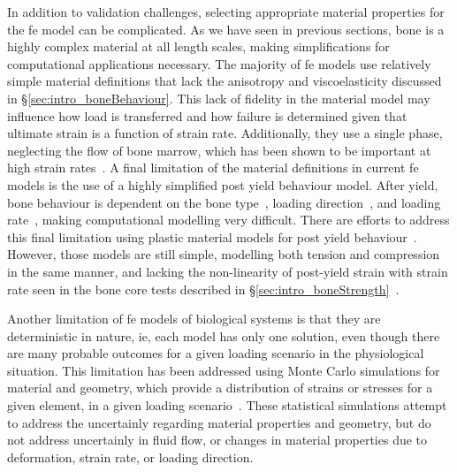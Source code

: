 In addition to validation challenges, selecting appropriate material properties for the \ac{fe} model can be complicated.
As we have seen in previous sections, bone is a highly complex material at all length scales, making simplifications for computational applications necessary.
The majority of \ac{fe} models use relatively simple material definitions that lack the anisotropy and viscoelasticity discussed in \S\ref{sec:intro_boneBehaviour}.
This lack of fidelity in the material model may influence how load is transferred and how failure is determined given that ultimate strain is a function of strain rate.
Additionally, they use a single phase, neglecting the flow of bone marrow, which has been shown to be important at high strain rates~\citep{carter_compressive_1977}.
A final limitation of the material definitions in current \ac{fe} models is the use of a highly simplified post yield behaviour model.
After yield, bone behaviour is dependent on the bone type~\citep{hayes_biomechanics_1997}, loading direction~\citep{hansen_effect_2008}, and loading rate~\citep{hansen_effect_2008, kulin_effects_2011, kulin_loading_2011}, making computational modelling very difficult.
There are efforts to address this final limitation using plastic material models for post yield behaviour~\citep{derikx_implementation_2011, verhulp_micro-finite_2008, bayraktar_comparison_2004}.
However, those models are still simple, modelling both tension and compression in the same manner, and lacking the non-linearity of post-yield strain with strain rate seen in the bone core tests described in \S\ref{sec:intro_boneStrength}~\citep{derikx_implementation_2011, bayraktar_comparison_2004}.

Another limitation of \ac{fe} models of biological systems is that they are deterministic in nature, \ac{ie}, each model has only one solution, even though there are many probable outcomes for a given loading scenario in the physiological situation.
This limitation has been addressed using Monte Carlo simulations for material and geometry, which provide a distribution of strains or stresses for a given element, in a given loading scenario~\citep{bryan_use_2009, taddei_finite-element_2006, laz_incorporating_2007}.
These statistical simulations attempt to address the uncertainly regarding material properties and geometry, but do not address uncertainly in fluid flow, or changes in material properties due to deformation, strain rate, or loading direction.
	
